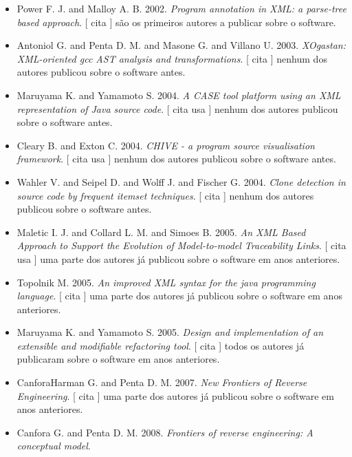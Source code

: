 \begin{itemize}
\item Power F. J. and Malloy A. B.
      2002.
        \textit{ Program annotation in XML: a parse-tree based approach}.
      [
          cita
      ]
são os primeiros autores a publicar sobre o software.
\item Antoniol G. and Penta D. M. and Masone G. and Villano U.
      2003.
        \textit{ XOgastan: XML-oriented gcc AST analysis and transformations}.
      [
          cita
      ]
nenhum dos autores publicou sobre o software antes.
\item Maruyama K. and Yamamoto S.
      2004.
        \textit{ A CASE tool platform using an XML representation of Java source code}.
      [
          cita
          usa
      ]
nenhum dos autores publicou sobre o software antes.
\item Cleary B. and Exton C.
      2004.
        \textit{ CHIVE - a program source visualisation framework}.
      [
          cita
          usa
      ]
nenhum dos autores publicou sobre o software antes.
\item Wahler V. and Seipel D. and Wolff J. and Fischer G.
      2004.
        \textit{ Clone detection in source code by frequent itemset techniques}.
      [
          cita
      ]
nenhum dos autores publicou sobre o software antes.
\item Maletic I. J. and Collard L. M. and Simoes B.
      2005.
        \textit{ An XML Based Approach to Support the Evolution of Model-to-model Traceability Links}.
      [
          cita
          usa
      ]
uma parte dos autores já publicou sobre o software em anos anteriores.
\item Topolnik M.
      2005.
        \textit{ An improved XML syntax for the java programming language}.
      [
          cita
      ]
uma parte dos autores já publicou sobre o software em anos anteriores.
\item Maruyama K. and Yamamoto S.
      2005.
        \textit{ Design and implementation of an extensible and modifiable refactoring tool}.
      [
          cita
      ]
todos os autores já publicaram sobre o software em anos anteriores.
\item CanforaHarman G. and Penta D. M.
      2007.
        \textit{ New Frontiers of Reverse Engineering}.
      [
          cita
      ]
uma parte dos autores já publicou sobre o software em anos anteriores.
\item Canfora G. and Penta D. M.
      2008.
        \textit{ Frontiers of reverse engineering: A conceptual model}.

\end{itemize}
